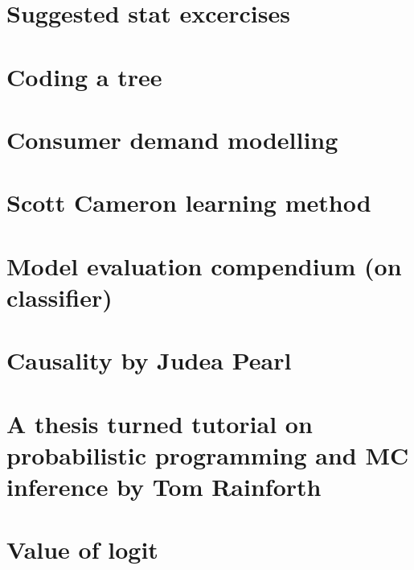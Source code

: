 \documentclass[letterpaper,10pt,english]{sphinxmanual}
\begin{document}
\section{Suggested stat excercises}
\label{\detokenize{tweets:suggested-stat-excercises}}



\section{Coding a tree}
\label{\detokenize{tweets:coding-a-tree}}



\section{Consumer demand modelling}
\label{\detokenize{tweets:consumer-demand-modelling}}



\section{Scott Cameron learning method}
\label{\detokenize{tweets:scott-cameron-learning-method}}



\section{Model evaluation compendium (on classifier)}
\label{\detokenize{tweets:model-evaluation-compendium-on-classifier}}



\section{Causality by Judea Pearl}
\label{\detokenize{tweets:causality-by-judea-pearl}}



\section{A thesis turned tutorial on probabilistic programming and MC inference by Tom Rainforth}
\label{\detokenize{tweets:a-thesis-turned-tutorial-on-probabilistic-programming-and-mc-inference-by-tom-rainforth}}



\section{Value of logit}
\label{\detokenize{tweets:value-of-logit}}




\renewcommand{\indexname}{Index}
\printindex
\end{document}
